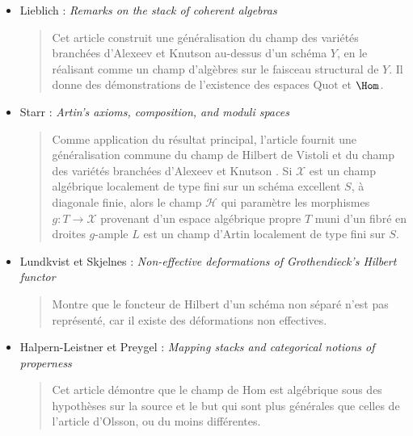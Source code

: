 \begin{itemize}
(\cite{alexeev-knutson})
\begin{quote}
Ils définissent une variété branchée de $\mathbf{P}^n$ comme un morphisme fini
$X \rightarrow \mathbf{P}^n$ provenant d'un schéma \emph{réduit} $X$. Ils
démontrent que le champ de modules des variétés branchées de polynôme de
Hilbert fixé et de degrés totaux fixés pour les composantes de dimension $i$
est un champ d'Artin propre à stabilisateur fini. Ils comparent le champ des
variétés branchées au schéma de Hilbert, au schéma de Chow et à l'espace de
modules des applications stables.
\end{quote}
\item Lieblich : \emph{Remarks on the stack of coherent algebras}
\cite{lieblich_remarks}
\begin{quote}
Cet article construit une généralisation du champ des variétés branchées
d'Alexeev et Knutson au-dessus d'un schéma $Y$, en le réalisant comme un champ
d'algèbres sur le faisceau structural de $Y$. Il donne des démonstrations de
l'existence des espaces $\text{Quot}$ et $\Hom$.
\end{quote}
\item Starr : \emph{Artin's axioms, composition, and moduli spaces}
\cite{starr_artin}
\begin{quote}
Comme application du résultat principal, l'article fournit une généralisation
commune du champ de Hilbert de Vistoli \cite{vistoli_hilbert} et du champ des
variétés branchées d'Alexeev et Knutson \cite{alexeev-knutson}. Si
$\mathcal{X}$ est un champ algébrique localement de type fini sur un schéma
excellent $S$, à diagonale finie, alors le champ $\mathcal{H}$ qui paramètre
les morphismes $g: T \rightarrow \mathcal{X}$ provenant d'un espace algébrique
propre $T$ muni d'un fibré en droites $g$-ample $L$ est un champ d'Artin
localement de type fini sur $S$.
\end{quote}
\item Lundkvist et Skjelnes :
\emph{Non-effective deformations of Grothendieck's Hilbert functor}
\cite{lundkvist-skjelnes}
\begin{quote}
Montre que le foncteur de Hilbert d'un schéma non séparé n'est pas représenté,
car il existe des déformations non effectives.
\end{quote}
\item Halpern-Leistner et Preygel :
\emph{Mapping stacks and categorical notions of properness}
\cite{HL-P}
\begin{quote}
Cet article démontre que le champ de Hom est algébrique sous des hypothèses sur
la source et le but qui sont plus générales que celles de l'article d'Olsson,
ou du moins différentes.
\end{quote}
\end{itemize}



